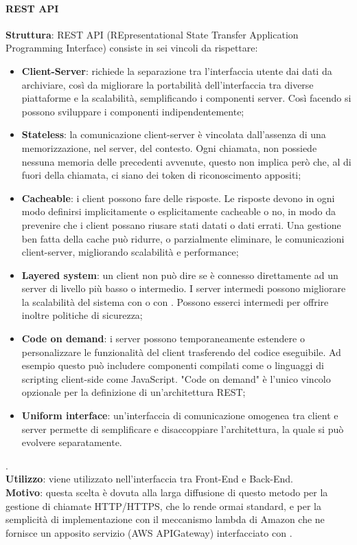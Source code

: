 \documentclass[../DefinizioneDiProdotto_v2.0.0.tex]{subfiles}
\begin{document}
\paragraph{REST API}\mbox{}
\begin{addmargin}[1em]{2em}%
	\textbf{Struttura}: REST API (REpresentational State Transfer Application Programming Interface) consiste in sei vincoli da rispettare:
	\begin{itemize}
		\item \textbf{Client-Server}: richiede la separazione tra l'interfaccia utente dai dati da archiviare, così da migliorare la portabilità dell'interfaccia tra diverse piattaforme e la scalabilità, semplificando i componenti server. Così facendo si possono sviluppare i componenti indipendentemente;
		\item \textbf{Stateless}: la comunicazione client-server è vincolata dall'assenza di una memorizzazione, nel server, del contesto. Ogni chiamata, non possiede nessuna memoria delle precedenti avvenute, questo non implica però che, al di fuori della chiamata, ci siano dei token di riconoscimento appositi;
		\item \textbf{Cacheable}:  i client possono fare  delle risposte. Le risposte devono in ogni modo definirsi implicitamente o esplicitamente cacheable o no, in modo da prevenire che i client possano riusare stati datati o dati errati. Una gestione ben fatta della cache può ridurre, o parzialmente eliminare, le comunicazioni client-server, migliorando scalabilità e performance;
		\item \textbf{Layered system}: un client non può dire se è connesso direttamente ad un server di livello più basso o intermedio. I server intermedi possono migliorare la scalabilità del sistema con  o con . Possono esserci  intermedi per offrire inoltre politiche di sicurezza;
		\item \textbf{Code on demand}:  i server possono temporaneamente estendere o personalizzare le funzionalità del client trasferendo del codice eseguibile. Ad esempio questo può includere componenti compilati come  o linguaggi di scripting client-side come JavaScript. "Code on demand" è l'unico vincolo opzionale per la definizione di un'architettura REST;
		\item \textbf{Uniform interface}: un'interfaccia di comunicazione omogenea tra client e server permette di semplificare e disaccoppiare l'architettura, la quale si può evolvere separatamente.
	\end{itemize}.\\
	\textbf{Utilizzo}: viene utilizzato nell'interfaccia tra Front-End e Back-End.\\
	\textbf{Motivo}: questa scelta è dovuta alla larga diffusione di questo metodo per la gestione di chiamate HTTP/HTTPS, che lo rende ormai standard, e per la semplicità di implementazione con il meccanismo lambda di Amazon che ne fornisce un apposito servizio (AWS APIGateway) interfacciato con .

\end{addmargin}
\end{document}
